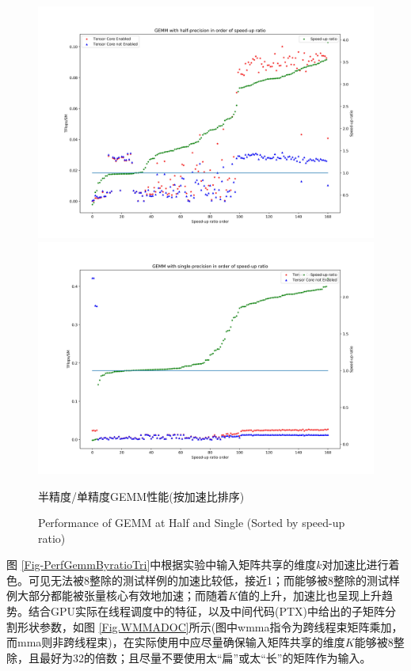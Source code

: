 \begin{figure}
	\centering
	\includegraphics[width=15cm]{figures/GEMM-Half-TF-Byratio.jpg}\\
	\includegraphics[width=15cm]{figures/GEMM-Single-TF-Byratio.jpg}
	\renewcommand{\thefigure}{\arabic{section}-\arabic{figure} }
	\renewcommand{\figurename}{图}
	\caption{半精度/单精度GEMM性能(按加速比排序)}
	\addtocounter{figure}{-1}
	\renewcommand{\thefigure}{\arabic{section}-\arabic{figure} }
	\renewcommand{\figurename}{Figure}
	\caption{Performance of GEMM at Half and Single (Sorted by speed-up ratio)}
	\label{Fig-PerfGemmByratio}
\end{figure}
\par 图 \ref{Fig-PerfGemmByratioTri}中根据实验中输入矩阵共享的维度$ k $对加速比进行着色。可见无法被8整除的测试样例的加速比较低，接近1；而能够被8整除的测试样例大部分都能被张量核心有效地加速；而随着$ K $值的上升，加速比也呈现上升趋势。结合GPU实际在线程调度中的特征，以及中间代码(PTX)中给出的子矩阵分割形状参数，如图 \ref{Fig.WMMADOC}所示(图中wmma指令为跨线程束矩阵乘加，而mma则非跨线程束)，在实际使用中应尽量确保输入矩阵共享的维度$ K $能够被8整除，且最好为32的倍数；且尽量不要使用太“扁”或太“长”的矩阵作为输入。
